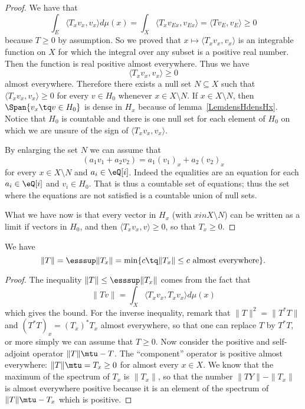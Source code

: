 \begin{proof}
	We have that
	\begin{equation}
		\int_E\langle T_xv_x, v_x\rangle d\mu(x)=\int_X\langle T_xv_{Ex}, v_{Ex}\rangle =\langle Tv_E, v_E\rangle \geq 0
	\end{equation}
	because $T\geq 0$ by assumption. So we proved that $x\mapsto\langle T_xv_x, v_x\rangle $ is an integrable function on $X$ for which the integral over any subset is a positive real number. Then the function is real positive almost everywhere. Thus we have
	\begin{equation}
		\langle T_xv_x, v_x\rangle \geq 0
	\end{equation}
	almost everywhere. Therefore there exists a null set $N\subseteq X$ such that $\langle T_xv_x, v_x\rangle \geq 0$ for every $v\in H_0$ whenever $x\in X\setminus N$. If $x\in X\setminus N$, then $\Span\{ v_x\tq v\in H_0 \}$ is dense in $H_x$ because of lemma~\ref{LemdensHdensHx}. Notice that $H_0$ is countable and there is one null set for each element of $H_0$ on which we are unsure of the sign of $\langle T_xv_x, v_x\rangle $.

	By enlarging the set $N$ we can assume that
	\begin{equation}
		(a_1v_1+a_2v_2)=a_1(v_1)_x+a_2(v_2)_x
	\end{equation}
	for every $x\in X\setminus N$ and $a_i\in\eQ[i]$. Indeed the equalities are an equation for each $a_i\in\eQ[i]$ and $v_i\in H_0$. That is thus a countable set of equations; thus the set where the equations are not satisfied is a countable union of null sets.

	What we have now is that every vector in $H_x$ (with $xin X\setminus N$) can be written as a limit if vectors in $H_0$, and then $\langle T_xv_x, v\rangle \geq 0$, so that $T_x\geq 0$.

\end{proof}

\begin{lemma}
We have
\begin{equation}
	\| T \|=\esssup\| T_x \|=\min\{ c\tq \| T_x \|\leq c\text{ almost everywhere} \}.
\end{equation}
\end{lemma}

\begin{proof}
	The inequality $\| T \|\leq\esssup\| T_x \|$ comes from the fact that
	\begin{equation}
		\| Tv \|=\int_X\langle T_xv_x, T_xv_x\rangle d\mu(x)
	\end{equation}
	which gives the bound. For the inverse inequality, remark that $\| T \|^2=\| T^*T \|$ and $(T^*T)_x=(T_x)^*T_x$ almost everywhere, so that one can replace $T$ by $T^*T$, or more simply we can assume that $T\geq 0$. Now consider the positive and self-adjoint operator $\| T \|\mtu-T$. The ``component'' operator is positive almost everywhere: $\| T \|\mtu=T_x\geq 0$ for almost every $x\in X$. We know that the maximum of the spectrum of $T_x$ is $\| T_x \|$, so that the number $\| TY \|-\| T_x \|$ is almost everywhere positive because it is an element of the spectrum of $\| T \|\mtu-T_x$ which is positive.
\end{proof}

